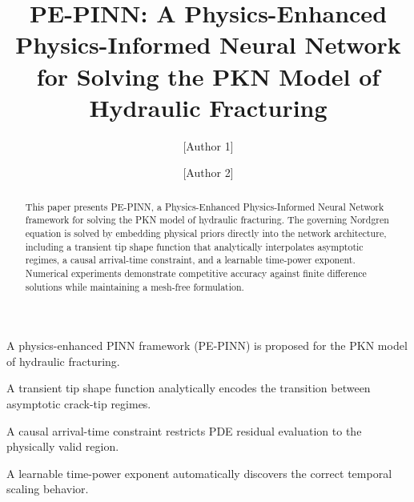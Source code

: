 \documentclass[a4paper,fleqn]{cas-sc}
\begin{document}
\let\WriteBookmarks\relax
\def\floatpagepagefraction{1}
\def\textpagefraction{.001}


\shortauthors{[Authors]}

\title [mode = title]{PE-PINN: A Physics-Enhanced Physics-Informed Neural Network \\
for Solving the PKN Model of Hydraulic Fracturing}

\tnotemark[1]

\author[1]{[Author 1]}
\cormark[1]
\fnmark[1]
\ead{[email]}



\author[2]{[Author 2]}
\fnmark[2]
\ead{[email]}





\begin{abstract}
This paper presents PE-PINN, a Physics-Enhanced Physics-Informed Neural
Network framework for solving the PKN model of hydraulic fracturing.
The governing Nordgren equation is solved by embedding physical priors
directly into the network architecture, including a transient tip shape
function that analytically interpolates asymptotic regimes, a causal
arrival-time constraint, and a learnable time-power exponent. Numerical
experiments demonstrate competitive accuracy against finite difference
solutions while maintaining a mesh-free formulation.
\end{abstract}

\begin{highlights}
\item A physics-enhanced PINN framework (PE-PINN) is proposed for the PKN model of hydraulic fracturing.
\item A transient tip shape function analytically encodes the transition between asymptotic crack-tip regimes.
\item A causal arrival-time constraint restricts PDE residual evaluation to the physically valid region.
\item A learnable time-power exponent automatically discovers the correct temporal scaling behavior.
\end{highlights}
\end{document}
